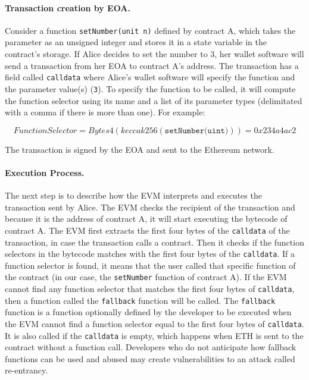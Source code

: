 \paragraph{Transaction creation by EOA.} Consider a function \texttt{setNumber(unit n)} defined by contract A, which takes the parameter as an unsigned integer and stores it in a state variable in the contract's storage. If Alice decides to set the number to 3, her wallet software will send a transaction from her EOA to contract A's address. The transaction has a field called \texttt{calldata} where Alice's wallet software will specify the function and the parameter value(s) (\texttt{3}). To specify the function to be called, it will compute the function selector using its name and a list of its parameter types (delimitated with a comma if there is more than one). For example:

\begin{equation}
    Function Selector = Bytes4(keccak256(\texttt{setNumber(uint)})) = 0x234a4ac2
\end{equation}

The transaction is signed by the EOA and sent to the Ethereum network.

\paragraph{Execution Process. } 
The next step is to describe how the EVM interprets and executes the transaction sent by Alice. The EVM checks the recipient of the transaction and because it is the address of contract A, it will start executing the bytecode of contract A. The EVM first extracts the first four bytes of the \texttt{calldata} of the transaction, in case the transaction calls a contract. Then it checks if the function selectors in the bytecode matches with the first four bytes of the \texttt{calldata}. If a function selector is found, it means that the user called that specific function of the contract (in our case, the \texttt{setNumber} function of contract A). If the EVM cannot find any function selector that matches the first four bytes of \texttt{calldata}, then a function called the \texttt{fallback} function will be called. The \texttt{fallback} function is a function optionally defined by the developer to be executed when the EVM cannot find a function selector equal to the first four bytes of \texttt{calldata}. It is also called if the \texttt{calldata} is empty, which happens when ETH is sent to the contract without a function call. Developers who do not anticipate how fallback functions can be used and abused may create vulnerabilities to an attack called re-entrancy.

